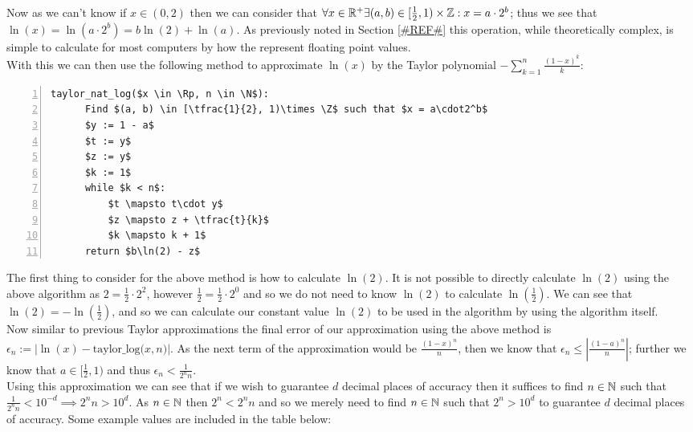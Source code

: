 Now as we can't know if \(x \in (0,2)\) then we can consider that \(\forall x \in \mathbb{R}^+ \exists (a, b) \in [\frac{1}{2}, 1)\times\mathbb{Z} : x = a\cdot2^b\); thus we see that \(\ln(x) = \ln(a\cdot2^b) = b\ln(2) + \ln(a)\). As previously noted in Section \ref{#REF#} this operation, while theoretically complex, is simple to calculate for most computers by how the represent floating point values.\\

With this we can then use the following method to approximate \(\ln(x)\) by the Taylor polynomial \(-\sum_{k=1}^n\frac{(1-x)^k}{k}\):

\begin{lstlisting}[numbers=left,frame=single,mathescape,caption={Taylor Method for calculating \(\ln(x)\)},label={PCD_"taylor log"}]
  taylor_nat_log($x \in \Rp, n \in \N$):
      Find $(a, b) \in [\tfrac{1}{2}, 1)\times \Z$ such that $x = a\cdot2^b$
      $y := 1 - a$
      $t := y$
      $z := y$
      $k := 1$
      while $k < n$:
          $t \mapsto t\cdot y$
          $z \mapsto z + \tfrac{t}{k}$
          $k \mapsto k + 1$
      return $b\ln(2) - z$
\end{lstlisting}

The first thing to consider for the above method is how to calculate \(\ln(2)\). It is not possible to directly calculate \(\ln(2)\) using the above algorithm as \(2 = \frac{1}{2}\cdot2^2\), however \(\frac{1}{2} = \frac{1}{2}\cdot2^0\) and so we do not need to know \(\ln(2)\) to calculate \(\ln(\frac{1}{2})\). We can see that \(\ln(2) = -\ln(\frac{1}{2})\), and so we can calculate our constant value \(\ln(2)\) to be used in the algorithm by using the algorithm itself.\\

Now similar to previous Taylor approximations the final error of our approximation using the above method is \(\epsilon_n := |\ln(x) - \textrm{taylor\_log(}x,n\textrm{)}|\). As the next term of the approximation would be \(\tfrac{(1-x)^n}{n}\), then we know that \(\epsilon_n \le \left|\tfrac{(1-a)^n}{n}\right|\); further we know that \(a \in [\tfrac{1}{2}, 1)\) and thus \(\epsilon_n < \tfrac{1}{2^nn}\).\\

Using this approximation we can see that if we wish to guarantee \(d\) decimal places of accuracy then it suffices to find \(n \in \mathbb{N}\) such that \(\tfrac{1}{2^nn} < 10^{-d} \implies 2^nn > 10^d\). As \(n \in \mathbb{N}\) then \(2^n < 2^nn\) and so we merely need to find \(n \in \mathbb{N}\) such that \(2^n > 10^d\) to guarantee \(d\) decimal places of accuracy. Some example values are included in the table below:\\

